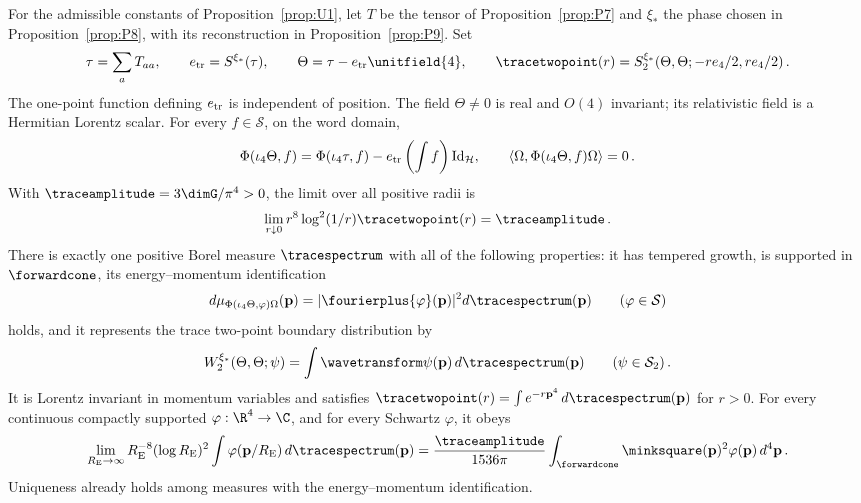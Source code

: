 \begin{proposition}\label{prop:P10}
For the admissible constants of Proposition~\ref{prop:U1}, let $T$ be the tensor of Proposition~\ref{prop:P7} and $\xi_*$ the phase chosen in Proposition~\ref{prop:P8}, with its reconstruction in Proposition~\ref{prop:P9}. Set
\begin{equation}\label{eq:P10-1}
\tau=\sum_aT_{aa},\qquad e_{\rm tr}=S^{\xi_*}(\tau),\qquad \Theta=\tau-e_{\rm tr}\unitfield{4},\qquad \tracetwopoint(r)=S_2^{\xi_*}(\Theta,\Theta;-re_4/2,re_4/2)\,.
\end{equation}
The one-point function defining $e_{\rm tr}$ is independent of position. The field $\Theta\ne0$ is real and $O(4)$ invariant; its relativistic field is a Hermitian Lorentz scalar. For every $f\in\mathcal S$, on the word domain,
\begin{equation}\label{eq:P10-2}
\Phi(\iota_4\Theta,f)=\Phi(\iota_4\tau,f)-e_{\rm tr}\left(\int f\right)\mathrm{Id}_{\mathcal H},\qquad
\langle\Omega,\Phi(\iota_4\Theta,f)\Omega\rangle=0\,.
\end{equation}
With $\traceamplitude=3\dimG/\pi^4>0$, the limit over all positive radii is
\begin{equation}\label{eq:P10-3}
\lim_{r\downarrow0}r^8\log^2(1/r)\tracetwopoint(r)=\traceamplitude\,.
\end{equation}
There is exactly one positive Borel measure $\tracespectrum$ with all of the following properties: it has tempered growth, is supported in $\forwardcone$, its energy–momentum identification
\begin{equation}\label{eq:P10-4}
d\mu_{\Phi(\iota_4\Theta,\varphi)\Omega}(\mathbf p)=|\fourierplus{\varphi}(\mathbf p)|^2d\tracespectrum(\mathbf p)\qquad(\varphi\in\mathcal S)
\end{equation}
holds, and it represents the trace two-point boundary distribution by
\begin{equation}\label{eq:P10-5}
W_2^{\xi_*}(\Theta,\Theta;\psi)=\int\wavetransform\psi(\mathbf p)\,d\tracespectrum(\mathbf p)\qquad(\psi\in\mathcal S_2)\,.
\end{equation}
It is Lorentz invariant in momentum variables and satisfies $\tracetwopoint(r)=\int e^{-r\mathbf p^4}\,d\tracespectrum(\mathbf p)$ for $r>0$. For every continuous compactly supported $\varphi:\R^4\to\C$, and for every Schwartz $\varphi$, it obeys
\begin{equation}\label{eq:P10-6}
\lim_{R_{\rm E}\to\infty}R_{\rm E}^{-8}(\log R_{\rm E})^2\int\varphi(\mathbf p/R_{\rm E})\,d\tracespectrum(\mathbf p)
=\frac{\traceamplitude}{1536\pi}\int_{\forwardcone}\minksquare(\mathbf p)^2\varphi(\mathbf p)\,d^4\mathbf p\,.
\end{equation}
Uniqueness already holds among measures with the energy–momentum identification.
\end{proposition}

